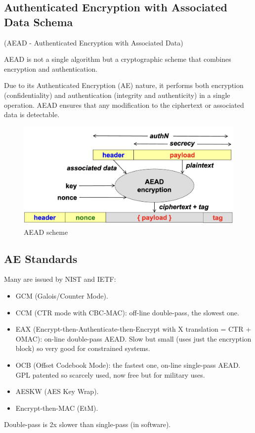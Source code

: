 \clearpage
\subsection{Authenticated Encryption with Associated Data Schema}
\begin{center}
    (AEAD - Authenticated Encryption with Associated Data)
\end{center}
\begin{tcolorbox}[colback=red!10!white, colframe=red!70!black, coltitle=white, title=Beware]
    AEAD is not a single algorithm but a cryptographic scheme that combines encryption and authentication. 
\end{tcolorbox}
Due to its Authenticated Encryption (AE) nature, it performs both encryption (confidentiality) and authentication (integrity and authenticity) in a single operation. AEAD ensures that any modification to the ciphertext or associated data is detectable.

\begin{figure}[H]
    \centering
    \includegraphics[width=0.6\linewidth]{Images/Cryptography/aead.png}
    \caption{AEAD scheme}
\end{figure}

\subsection{AE Standards}
Many are issued by NIST and IETF:
\begin{itemize}
    \item GCM (Galois/Counter Mode).
    \item CCM (CTR mode with CBC-MAC): off-line double-pass, the slowest one.
    \item EAX (Encrypt-then-Authenticate-then-Encrypt with X translation = CTR + OMAC): on-line double-pass AEAD. Slow but small (uses just the encryption block) so very good for constrained systems.
    \item OCB (Offset Codebook Mode): the fastest one, on-line single-pass AEAD. GPL patented so scarcely used, now free but for military uses.
    \item AESKW (AES Key Wrap).
    \item Encrypt-then-MAC (EtM).
\end{itemize}
\begin{tcolorbox}[colback=blue!10!white, colframe=blue!50!white]
Double-pass is 2x slower than single-pass (in software).
\end{tcolorbox}

